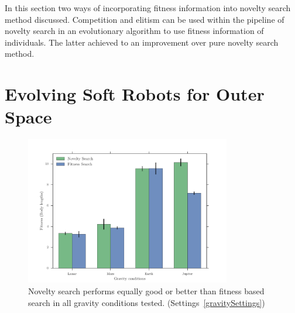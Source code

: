 In this section two ways of incorporating fitness information into novelty search method discussed. Competition and elitism can be used within the pipeline of novelty search in an evolutionary algorithm to use fitness information of individuals. The latter achieved to an improvement over pure novelty search method.















\section{Evolving Soft Robots for Outer Space}  

\begin{figure}[t!]
\centering
\includegraphics[width=0.8\textwidth]{../Figures/Results/GravityExperiment.pdf}
\caption{Novelty search performs equally good or better than fitness based search in all gravity conditions tested. (Settings~\ref{gravitySettings})}
\label{fig:gravityConditions}
\end{figure}

